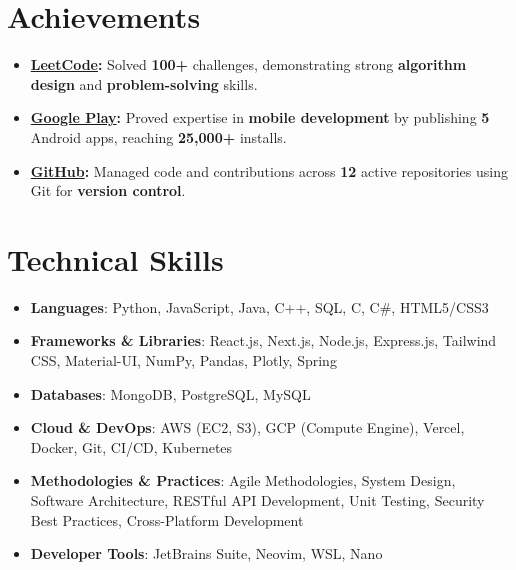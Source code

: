 \documentclass[letterpaper,11pt]{article}
\newcommand{\resumeItem}[1]{
  \item\small{#1 \vspace{-2pt}}
}
\newcommand{\resumeSubHeadingListStart}{\begin{itemize}[leftmargin=0.15in, label={}]}
\newcommand{\resumeSubHeadingListEnd}{\end{itemize}}
\begin{document}
\section{Achievements}
\resumeSubHeadingListStart
  \resumeItem{\textbf{\href{https://leetcode.com/u/abhay-byte/}{LeetCode}:} Solved \textbf{100+} challenges, demonstrating strong \textbf{algorithm design} and \textbf{problem-solving} skills.}
  \resumeItem{\textbf{\href{https://play.google.com/store/apps/dev?id=8004929841101888920}{Google Play}:} Proved expertise in \textbf{mobile development} by publishing \textbf{5} Android apps, reaching \textbf{25,000+} installs.}
  \resumeItem{\textbf{\href{https://github.com/abhay-byte/}{GitHub}:} Managed code and contributions across \textbf{12} active repositories using Git for \textbf{version control}.}
\resumeSubHeadingListEnd

\section{Technical Skills}
\resumeSubHeadingListStart
  \resumeItem{\textbf{Languages}: Python, JavaScript, Java, C++, SQL, C, C\#, HTML5/CSS3}
  \resumeItem{\textbf{Frameworks \& Libraries}: React.js, Next.js, Node.js, Express.js, Tailwind CSS, Material-UI, NumPy, Pandas, Plotly, Spring}
  \resumeItem{\textbf{Databases}: MongoDB, PostgreSQL, MySQL}
  \resumeItem{\textbf{Cloud \& DevOps}: AWS (EC2, S3), GCP (Compute Engine), Vercel, Docker, Git, CI/CD, Kubernetes}
  \resumeItem{\textbf{Methodologies \& Practices}: Agile Methodologies, System Design, Software Architecture, RESTful API Development, Unit Testing, Security Best Practices, Cross-Platform Development}
  \resumeItem{\textbf{Developer Tools}: JetBrains Suite, Neovim, WSL, Nano}
\resumeSubHeadingListEnd

\end{document}
